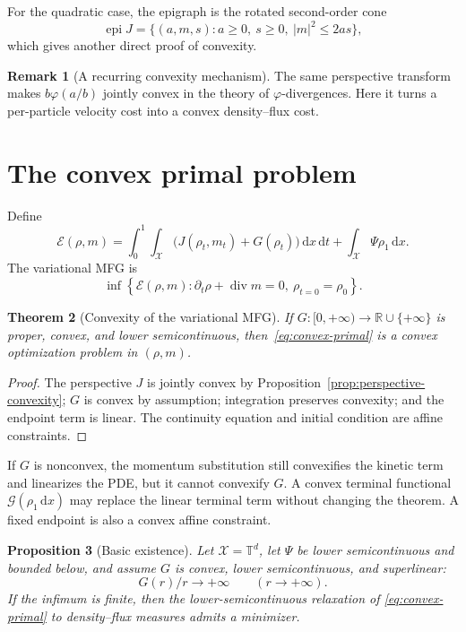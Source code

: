 \documentclass[11pt,a4paper]{article}
\newtheorem{theorem}{Theorem}[section]
\newtheorem{proposition}[theorem]{Proposition}
\theoremstyle{definition}
\newtheorem{remark}[theorem]{Remark}
\newcommand{\RR}{\mathbb R}
\newcommand{\diverg}{\operatorname{div}}
\newcommand{\dd}{\,\mathrm d}
\newcommand{\abs}[1]{\left\lvert#1\right\rvert}
\begin{document}
For the quadratic case, the epigraph is the rotated second-order cone
\[
  \operatorname{epi}J
  =\{(a,m,s):a\geq0,\ s\geq0,\ \abs m^2\leq2as\},
\]
which gives another direct proof of convexity.

\begin{remark}[A recurring convexity mechanism]
The same perspective transform makes
\(b\varphi(a/b)\) jointly convex in the theory of
\(\varphi\)-divergences. Here it turns a per-particle velocity cost into a
convex density--flux cost.
\end{remark}

\section{The convex primal problem}

Define
\begin{equation}\label{eq:convex-energy}
  \mathcal E(\rho,m)=
  \int_0^1\!\int_{\mathcal X}
    \bigl(J(\rho_t,m_t)+G(\rho_t)\bigr)\dd x\dd t
  +\int_{\mathcal X}\Psi\rho_1\dd x.
\end{equation}
The variational MFG is
\begin{equation}\label{eq:convex-primal}
  \inf\left\{
    \mathcal E(\rho,m):
    \partial_t\rho+\diverg m=0,\ \rho_{t=0}=\rho_0
  \right\}.
\end{equation}

\begin{theorem}[Convexity of the variational MFG]
\label{thm:variational-mfg-convexity}
If \(G:[0,+\infty)\to\RR\cup\{+\infty\}\) is proper, convex, and lower
semicontinuous, then~\eqref{eq:convex-primal} is a convex optimization problem
in \((\rho,m)\).
\end{theorem}

\begin{proof}
The perspective \(J\) is jointly convex by
Proposition~\ref{prop:perspective-convexity}; \(G\) is convex by assumption;
integration preserves convexity; and the endpoint term is linear. The
continuity equation and initial condition are affine constraints.
\end{proof}

If \(G\) is nonconvex, the momentum substitution still convexifies the kinetic
term and linearizes the PDE, but it cannot convexify \(G\). A convex terminal
functional \(\mathcal G(\rho_1\dd x)\) may replace the linear terminal term
without changing the theorem. A fixed endpoint is also a convex affine
constraint.

\begin{proposition}[Basic existence]
\label{prop:variational-mfg-existence}
Let \(\mathcal X=\mathbb T^d\), let \(\Psi\) be lower semicontinuous and
bounded below, and assume
\(G\) is convex, lower semicontinuous, and superlinear:
\[
  G(r)/r\longrightarrow+\infty\qquad(r\to+\infty).
\]
If the infimum is finite, then the lower-semicontinuous relaxation of
\eqref{eq:convex-primal} to density--flux measures admits a minimizer.
\end{proposition}
\end{document}
